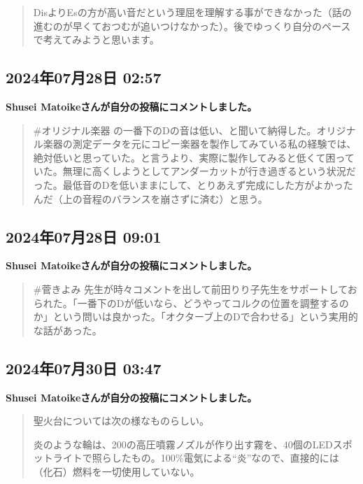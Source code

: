 \begin{quote}
DisよりEsの方が高い音だという理屈を理解する事ができなかった（話の進むのが早くておつむが追いつけなかった）。後でゆっくり自分のペースで考えてみようと思います。
\end{quote}

\subsection*{2024年07月28日 02:57}

\textbf{Shusei Matoikeさんが自分の投稿にコメントしました。}

\begin{quote}
\#オリジナル楽器 の一番下のDの音は低い、と聞いて納得した。オリジナル楽器の測定データを元にコピー楽器を製作してみている私の経験では、絶対低いと思っていた。と言うより、実際に製作してみると低くて困っていた。無理に高くしようとしてアンダーカットが行き過ぎるという状況だった。最低音のDを低いままにして、とりあえず完成にした方がよかったんだ（上の音程のバランスを崩さずに済む）と思う。
\end{quote}

\subsection*{2024年07月28日 09:01}

\textbf{Shusei Matoikeさんが自分の投稿にコメントしました。}

\begin{quote}
\#菅きよみ 先生が時々コメントを出して前田りり子先生をサポートしておられた。「一番下のDが低いなら、どうやってコルクの位置を調整するのか」という問いは良かった。「オクターブ上のDで合わせる」という実用的な話があった。
\end{quote}

\subsection*{2024年07月30日 03:47}

\textbf{Shusei Matoikeさんが自分の投稿にコメントしました。}

\begin{quote}
聖火台については次の様なものらしい。

炎のような輪は、200の高圧噴霧ノズルが作り出す霧を、40個のLEDスポットライトで照らしたもの。100\%電気による“炎”なので、直接的には（化石）燃料を一切使用していない。
\end{quote}

